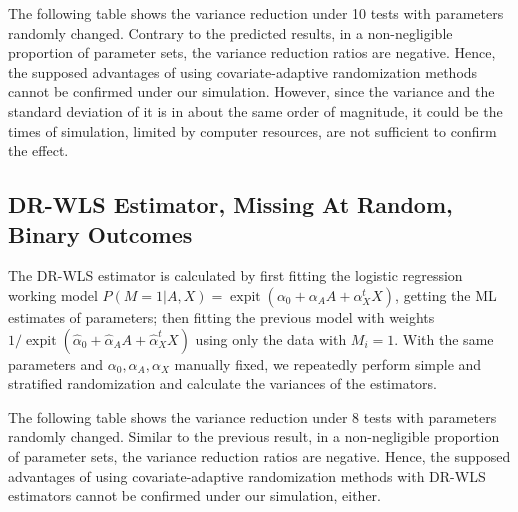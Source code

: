 \documentclass{article}
\begin{document}
The following table shows the variance reduction under 10 tests with parameters randomly changed. 
Contrary to the predicted results, in a non-negligible proportion of parameter sets, the variance reduction ratios are negative. Hence, the supposed advantages of using covariate-adaptive randomization methods cannot be confirmed under our simulation. However, since the variance and the standard deviation of it is in about the same order of magnitude, it could be the times of simulation, limited by computer resources, are not sufficient to confirm the effect.

\leavevmode\newline
{}
\leavevmode\newline

\subsection{DR-WLS Estimator, Missing At Random, Binary Outcomes}

The DR-WLS estimator is calculated by first fitting the logistic regression working model $P(M = 1|A, X) = \operatorname{expit}(\alpha_0 + \alpha_AA + \alpha^t_XX)$, getting the ML estimates of parameters; then fitting the previous model with weights $1/\operatorname{expit}(\hat\alpha_0 + \hat\alpha_AA + \hat\alpha^t_XX)$ using only the data with $M_i = 1$. With the same parameters and $\alpha_0, \alpha_A, \alpha_X$ manually fixed, we repeatedly perform simple and stratified randomization and calculate the variances of the estimators.
        
The following table shows the variance reduction under 8 tests with parameters randomly changed. Similar to the previous result, in a non-negligible proportion of parameter sets, the variance reduction ratios are negative. Hence, the supposed advantages of using covariate-adaptive randomization methods with DR-WLS estimators cannot be confirmed under our simulation, either.
\end{document}
